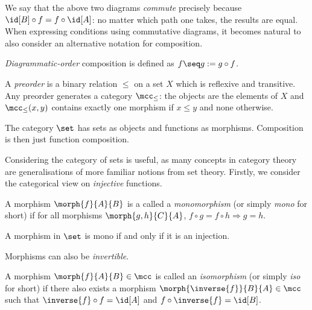 We say that the above two diagrams \emph{commute} precisely because \(
    \id[B] \circ f = f \circ \id[A]
\): no matter which path one takes, the results are equal.
When expressing conditions using commutative diagrams, it becomes natural to
also consider an alternative notation for composition.

\begin{notation}
    \emph{Diagrammatic-order} composition is defined as
    \(f \seq g := g \circ f\).
\end{notation}

\begin{example}[Preorder]
    A \emph{preorder} is a binary relation \(\leq\) on a set \(X\) which is
    reflexive and transitive.
    Any preorder generates a category \(\mcc_\leq\): the objects are the
    elements of \(X\) and \(\mcc_\leq(x, y)\) contains exactly one morphism if
    \(x \leq y\) and none otherwise.
\end{example}

\begin{example}
    The category \(\set\) has sets as objects and functions as morphisms.
    Composition is then just function composition.
\end{example}

Considering the category of sets is useful, as many concepts in category theory
are generalisations of more familiar notions from set theory.
Firstly, we consider the categorical view on \emph{injective} functions.

\begin{definition}[Monomorphism]
    A morphism \(\morph{f}{A}{B}\) is a called a \emph{monomorphism} (or simply
    \emph{mono} for short) if for all morphisms \(\morph{g,h}{C}{A}\), \(
        f \circ g = f \circ h \Rightarrow g = h
    \).
\end{definition}

\begin{example}
    A morphism in \(\set\) is mono if and only if it is an injection.
\end{example}

Morphisms can also be \emph{invertible}.

\begin{definition}[Isomorphism]
    A morphism \(\morph{f}{A}{B} \in \mcc\) is called an \emph{isomorphism} (or
    simply \emph{iso} for short) if there also exists a morphism \(
        \morph{\inverse{f}}{B}{A} \in \mcc
    \) such that \(
        \inverse{f} \circ f = \id[A]
    \) and \(
        f \circ \inverse{f} = \id[B]
    \).
\end{definition}

